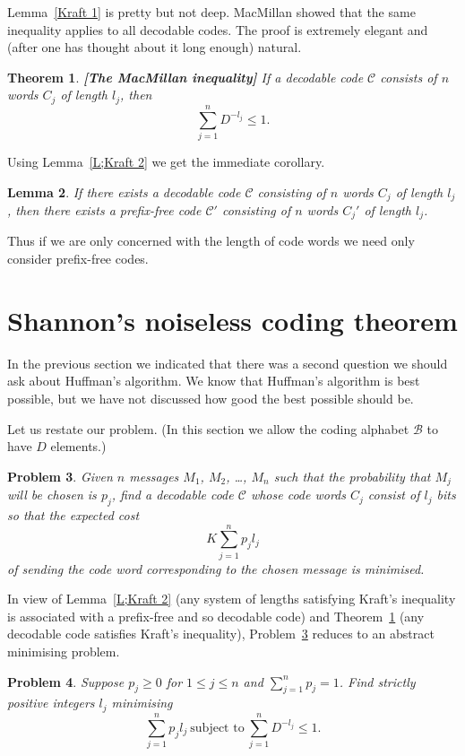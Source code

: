 \documentclass[12pt,a4paper]{article}
\theoremstyle{plain}
\newtheorem{theorem}{Theorem}[section]
\newtheorem{lemma}[theorem]{Lemma}
\newtheorem{problem}[theorem]{Problem}
\theoremstyle{definition}
\begin{document}
Lemma~\ref{Kraft 1} is pretty but not deep.
MacMillan showed that the same inequality
applies to all decodable codes. The proof is extremely 
elegant and (after one has thought about it
long enough) natural.
\begin{theorem}\label{T;MacMillan}{\bf [The MacMillan inequality]}
If a decodable code ${\mathcal C}$ consists
of $n$ words $C_{j}$ of length $l_{j}$, then
\[\sum_{j=1}^{n}D^{-l_{j}}\leq 1.\]
\end{theorem}
Using Lemma~\ref{L;Kraft 2} we get the immediate corollary.
\begin{lemma} If there exists a decodable code ${\mathcal C}$ 
consisting 
of $n$ words $C_{j}$ of length $l_{j}$, then
there exists a prefix-free code ${\mathcal C}'$ 
consisting 
of $n$ words $C_{j}'$ of length $l_{j}$.
\end{lemma}
Thus if we are only concerned with the length of code words
we need only consider prefix-free codes.
\section{Shannon's noiseless coding theorem}
In the previous section we indicated that there
was a second question we should ask about Huffman's
algorithm. We know that Huffman's algorithm is
best possible, but we have not discussed how good the
best possible should be.

Let us restate our problem. (In this section we allow
the coding alphabet ${\mathcal B}$ to have $D$ elements.) 
\begin{problem}\label{P;Compress two}
Given $n$ messages $M_{1}$, $M_{2}$,
\dots, $M_{n}$ such that the probability that $M_{j}$
will be chosen is $p_{j}$, find a decodable
code ${\mathcal C}$ whose code words  $C_{j}$
consist of $l_{j}$ bits so that the expected cost
\[K\sum_{j=1}^{n}p_{j}l_{j}\]
of sending the code word corresponding to the chosen
message is minimised.
\end{problem}
In view of Lemma~\ref{L;Kraft 2}
(any system of lengths
satisfying Kraft's inequality is associated  
with a prefix-free and so decodable code)
and Theorem~\ref{T;MacMillan} (any decodable
code satisfies Kraft's inequality),
Problem~\ref{P;Compress two} reduces to
an abstract minimising problem.
\begin{problem}\label{P;Compress three}
Suppose $p_{j}\geq 0$ for $1\leq j\leq n$ and $\sum_{j=1}^{n}p_{j}=1$.
Find strictly positive integers $l_{j}$  minimising
\[\sum_{j=1}^{n}p_{j}l_{j}\ \text{subject to} 
\ \sum_{j=1}^{n}D^{-l_{j}}\leq 1.\]
\end{problem}
\end{document}
